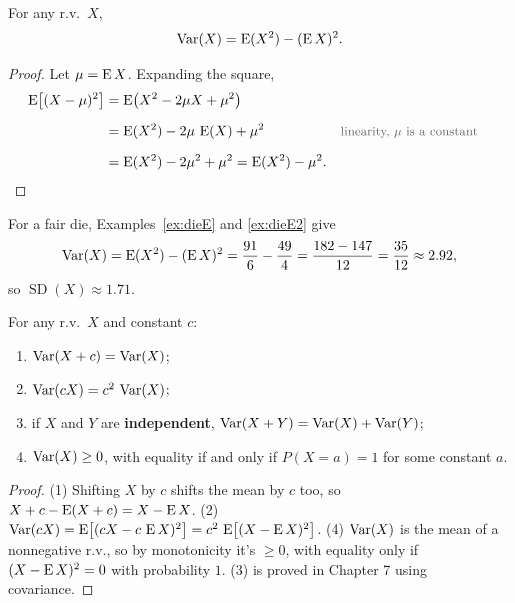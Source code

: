 \bigskip

\begin{theorem}\label{thm:varshortcut}
For any r.v.\ $X$,
\medskip
\[
\operatorname{Var}(X) = \operatorname{E}(X^{2}) - (\operatorname{E} X)^{2}.
\]
\end{theorem}

\medskip

\begin{proof}
Let $\mu = \operatorname{E} X$. Expanding the square,
\medskip
\begin{align*}
\E\bigl[(X - \mu)^{2}\bigr]
  &= \E\bigl(X^{2} - 2\mu X + \mu^{2}\bigr) \\[0.6em]
  &= \E(X^{2}) - 2\mu\,\E(X) + \mu^{2}
  && \by{linearity, $\mu$ is a constant} \\[0.6em]
  &= \E(X^{2}) - 2\mu^{2} + \mu^{2}
   = \E(X^{2}) - \mu^{2}.
\end{align*}
\end{proof}

\bigskip

\begin{example}
For a fair die, Examples~\ref{ex:dieE} and \ref{ex:dieE2} give
\medskip
\[
\operatorname{Var}(X) = \operatorname{E}(X^{2}) - (\operatorname{E} X)^{2} = \frac{91}{6} - \frac{49}{4} = \frac{182 - 147}{12} = \frac{35}{12} \approx 2.92,
\]
\medskip
so $\operatorname{SD}(X) \approx 1.71$.
\end{example}

\bigskip

\begin{theorem}\label{thm:varprops}
For any r.v.\ $X$ and constant $c$:
\medskip
\begin{enumerate}
  \setlength{\itemsep}{0.4em}
  \item $\operatorname{Var}(X + c) = \operatorname{Var}(X)$;
  \item $\operatorname{Var}(cX) = c^{2}\,\operatorname{Var}(X)$;
  \item if $X$ and $Y$ are \textbf{independent}, $\operatorname{Var}(X + Y) = \operatorname{Var}(X) + \operatorname{Var}(Y)$;
  \item $\operatorname{Var}(X) \ge 0$, with equality if and only if $P(X = a) = 1$ for some constant $a$.
\end{enumerate}
\end{theorem}

\medskip

\begin{proof}
(1) Shifting $X$ by $c$ shifts the mean by $c$ too, so $X + c - \operatorname{E}(X + c) = X - \operatorname{E} X$. (2) $\operatorname{Var}(cX) = \operatorname{E}\bigl[(cX - c\,\operatorname{E} X)^{2}\bigr] = c^{2}\,\operatorname{E}\bigl[(X - \operatorname{E} X)^{2}\bigr]$. (4) $\operatorname{Var}(X)$ is the mean of a nonnegative r.v., so by monotonicity it's $\ge 0$, with equality only if $(X - \operatorname{E} X)^{2} = 0$ with probability $1$. (3) is proved in Chapter 7 using covariance.
\end{proof}

